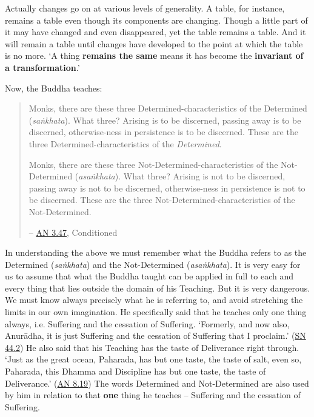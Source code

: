 Actually changes go on at various levels of generality. A table, for instance, remains a table even though its components are changing. Though a little part of it may have changed and even disappeared, yet the table remains a table. And it will remain a table until changes have developed to the point at which the table is no more. `A thing \textbf{remains the same} means it has become the \textbf{invariant of a transformation}.'

Now, the Buddha teaches:

\begin{quote}
Monks, there are these three Determined-characteristics of the Determined (\emph{saṅkhata}). What three? Arising is to be discerned, passing away is to be discerned, otherwise-ness in persistence is to be discerned. These are the three Determined-characteristics of the \emph{Determined}.

Monks, there are these three Not-Determined-characteristics of the Not-Determined (\emph{asaṅkhata}). What three? Arising is not to be discerned, passing away is not to be discerned, otherwise-ness in persistence is not to be discerned. These are the three Not-Determined-characteristics of the Not-Determined.

 -- \href{https://suttacentral.net/an3.47/en/bodhi}{AN 3.47}, Conditioned
\end{quote}

In understanding the above we must remember what the Buddha refers to as the Determined (\emph{saṅkhata}) and the Not-Determined (\emph{asaṅkhata}). It is very easy for us to assume that what the Buddha taught can be applied in full to each and every thing that lies outside the domain of his Teaching. But it is very dangerous. We must know always precisely what he is referring to, and avoid stretching the limits in our own imagination. He specifically said that he teaches only one thing always, i.e. Suffering and the cessation of Suffering. `Formerly, and now also, Anurādha, it is just Suffering and the cessation of Suffering that I proclaim.' (\href{https://suttacentral.net/sn44.2/en/sujato}{SN 44.2}) He also said that his Teaching has the taste of Deliverance right through. `Just as the great ocean, Paharada, has but one taste, the taste of salt, even so, Paharada, this Dhamma and Discipline has but one taste, the taste of Deliverance.' (\href{https://suttacentral.net/an8.19/en/bodhi}{AN 8.19}) The words Determined and Not-Determined are also used by him in relation to that \textbf{one} thing he teaches -- Suffering and the cessation of Suffering.

